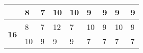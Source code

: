 \begin{table}[!htbp]
{\begin{tabular}{|c|ll|ll|ll|ll|}
                                 & \multicolumn{1}{l|}{8}                                                                                  & 7                                                                                                    & \multicolumn{1}{l|}{10}                                                                                 & 10                                                                                                   & \multicolumn{1}{l|}{9}                                                                                  & 9                                                                                                    & \multicolumn{1}{l|}{9}                                                                                  & 9                                                                                                    \\ \hline
\multirow{2}{*}{\textbf{16}}     & \multicolumn{1}{l|}{8}                                                                                  & 7                                                                                                    & \multicolumn{1}{l|}{12}                                                                                 & 7                                                                                                    & \multicolumn{1}{l|}{10}                                                                                 & 9                                                                                                    & \multicolumn{1}{l|}{10}                                                                                 & 9                                                                                                    \\ \cline{2-9} 
                                 & \multicolumn{1}{l|}{10}                                                                                 & 9                                                                                                    & \multicolumn{1}{l|}{9}                                                                                  & 9                                                                                                    & \multicolumn{1}{l|}{7}                                                                                  & 7                                                                                                    & \multicolumn{1}{l|}{7}                                                                                  & 7                                                                                                    \\ \hline

\end{tabular}}
\end{table}
